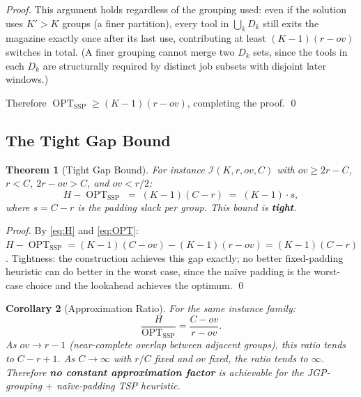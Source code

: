\documentclass[11pt,a4paper]{article}
\theoremstyle{plain}
\newtheorem{theorem}{Theorem}[section]
\newtheorem{corollary}[theorem]{Corollary}
\theoremstyle{definition}
\DeclareMathOperator{\OPT}{OPT}
\newcommand{\Heur}{H}               %
\begin{document}
\begin{proofbox}
\begin{proof}
This argument holds regardless of the grouping used: even if the solution uses
$K' > K$ groups (a finer partition), every tool in $\bigcup_k D_k$ still exits the
magazine exactly once after its last use, contributing at least $(K-1)(r-\mathit{ov})$
switches in total. (A finer grouping cannot merge two $D_k$ sets, since the tools in
each $D_k$ are structurally required by distinct job subsets with disjoint later windows.)

Therefore $\OPT_{\text{SSP}} \ge (K-1)(r-\mathit{ov})$, completing the proof.
\qed
\end{proof}
\end{proofbox}

\subsection{The Tight Gap Bound}
\label{sec:gap}

\begin{thmbox}
\begin{theorem}[Tight Gap Bound]
\label{thm:gap}
For instance $\mathcal{I}(K,r,\mathit{ov},C)$ with $\mathit{ov} \ge 2r - C$,
$r < C$, $2r - \mathit{ov} > C$, and $\mathit{ov} < r/2$:
\[
  \Heur - \OPT_{\text{SSP}} \;=\; (K-1)(C-r) \;=\; (K-1)\cdot s,
\]
where $s = C - r$ is the padding slack per group. This bound is \textbf{tight}.
\end{theorem}
\end{thmbox}

\begin{proof}
By \eqref{eq:H} and \eqref{eq:OPT}:
$\Heur - \OPT_{\text{SSP}} = (K-1)(C-\mathit{ov}) - (K-1)(r-\mathit{ov}) = (K-1)(C-r)$.
Tightness: the construction achieves this gap exactly; no better
fixed-padding heuristic can do better in the worst case, since the naïve
padding is the worst-case choice and the lookahead achieves the optimum.
\qed
\end{proof}

\begin{corollary}[Approximation Ratio]
\label{cor:ratio}
For the same instance family:
\[
  \frac{\Heur}{\OPT_{\text{SSP}}}
  = \frac{C - \mathit{ov}}{r - \mathit{ov}}.
\]
As $\mathit{ov} \to r-1$ (near-complete overlap between adjacent groups),
this ratio tends to $C - r + 1$.
As $C \to \infty$ with $r/C$ fixed and $\mathit{ov}$ fixed, the ratio tends to $\infty$.
Therefore \textbf{no constant approximation factor} is achievable for the
JGP-grouping $+$ naïve-padding TSP heuristic.
\end{corollary}
\end{document}
